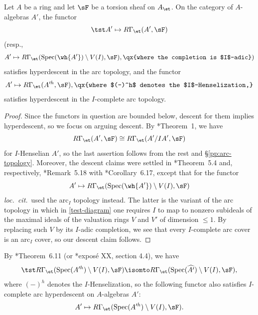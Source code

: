 \begin{theorem}
\notready\label{arc-descent}
Let $A$ be a ring  and let $\sF$ be a torsion sheaf on $A_\et$. On the category of $A$-algebras $A'$, the functor
\[
\tst A' \mapsto R\Gamma_\et(A', \sF)
\]
{\upshape(}resp.,
\[
A' \mapsto R\Gamma_\et(\Spec(\wh{A'})\setminus V(I), \sF), \qx{where the completion is $I$-adic})
\]
satisfies hyperdescent in the arc  topology, and the functor
\[
A' \mapsto R\Gamma_\et(A'^h, \sF), \qx{where $(-)^h$ denotes the $I$-Henselization,}
\]
satisfies hyperdescent in the $I$-complete arc topology.
\end{theorem}

\begin{proof}
Since the functors in question are bounded below, descent for them implies hyperdescent, so we focus on arguing descent.
By \cite{Gab94a}*{Theorem~1}, we have
\[
R\Gamma_\et(A', \sF) \cong R\Gamma_\et(A'/IA', \sF)
\]
for $I$-Henselian $A'$, so the last assertion follows from the rest and \S\ref{pp:arc-topology}. Moreover, the descent claims were settled in \cite{BM20}*{Theorem~5.4} and, respectively, \cite{Mat20}*{Remark~5.18} with \cite{BM20}*{Corollary~6.17}, except that for the functor
\[
A' \mapsto R\Gamma_\et(\Spec(\wh{A'})\setminus V(I), \sF)
\]
\emph{loc.~cit.}~used the arc$_I$ topology instead. The latter is the variant of the arc topology in which in \eqref{test-diagram} one requires $I$ to map to nonzero subideals of the maximal ideals of the  valuation rings $V$ and $V'$ of dimension $\le 1$. By replacing such $V$ by its $I$-adic completion, we see that every $I$-complete arc cover is an arc$_I$ cover, so our descent claim follows.
\end{proof}


\brem \label{BM-hens-comp}
By \cite{BM20}*{Theorem~6.11} (or \cite{ILO14}*{expos\'{e} XX, section 4.4}), we have
\[
\tst %
R\Gamma_\et(\Spec(A'^h)\setminus V(I),\sF) \isomto R\Gamma_\et(\Spec(\widehat{A'}) \setminus V(I),\sF),
\]
where $(-)^h$ denotes the $I$-Henselization, so the following functor also satisfies $I$-complete arc hyperdescent on $A$-algebras $A'$:
\[
A' \mapsto R\Gamma_\et(\Spec(A'^h)\setminus V(I), \sF).
\]
\erem





